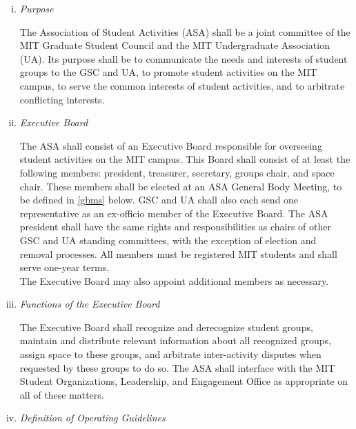 \documentclass[12pt]{constitution}
\begin{document}
\begin{enumerate}[i.]
\item \textit{Purpose}

The Association of Student Activities (ASA) shall be a joint committee of the MIT Graduate Student Council and
    the MIT Undergraduate Association (UA).
Its purpose shall be to communicate the needs and interests of student groups to the GSC and UA, to promote
    student activities on the MIT campus, to serve the common interests of student activities, and to
    arbitrate conflicting interests.

\item \textit{Executive Board}

The ASA shall consist of an Executive Board responsible for overseeing student activities on the MIT campus.
This Board shall consist of at least the following members: president, treasurer, secretary, groups chair, and space chair.
These members shall be elected at an ASA General Body Meeting, to be defined in \ref{gbms} below.
GSC and UA shall also each send one representative as an ex-officio member of the Executive Board.
The ASA president shall have the same rights and responsibilities as chairs of other GSC and UA standing committees,
    with the exception of election and removal processes.
All members must be registered MIT students and shall serve one-year terms.
\\

The Executive Board may also appoint additional members as necessary.

\item \textit{Functions of the Executive Board}

The Executive Board shall recognize and derecognize student groups, maintain and distribute relevant information
    about all recognized groups, assign space to these groups, and arbitrate inter-activity disputes when requested
    by these groups to do so.
The ASA shall interface with the MIT Student Organizations, Leadership, and Engagement Office as appropriate
    on all of these matters.

\item \textit{Definition of Operating Guidelines}
\label{gsc_bylaws:5iv}


\end{enumerate}
\end{document}
